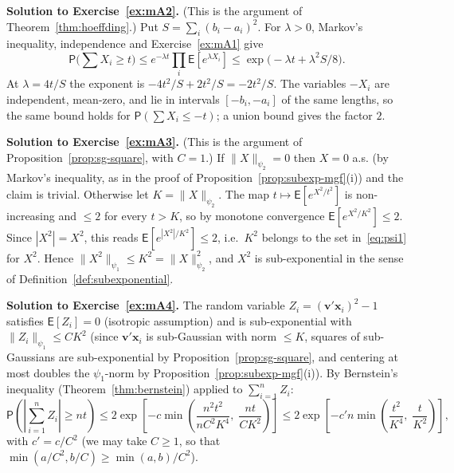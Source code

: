\documentclass[12pt,a4paper]{article}
\theoremstyle{definition}
\newcommand\expc{\mathsf{E}}
\newcommand\prb{\mathsf{P}}
\newcommand{\bx}{\mathbf{x}}
\newcommand{\bv}{\mathbf{v}}
\begin{document}
\textbf{Solution to Exercise~\ref{ex:mA2}.} (This is the argument of Theorem~\ref{thm:hoeffding}.) Put $S = \sum_i(b_i - a_i)^2$. For $\lambda > 0$, Markov's inequality, independence and Exercise~\ref{ex:mA1} give
\[
\prb\Big(\sum X_i \geqslant t\Big) \leqslant e^{-\lambda t}\prod_i\expc[e^{\lambda X_i}] \leqslant \exp\!\big(-\lambda t + \lambda^2 S/8\big).
\]
At $\lambda = 4t/S$ the exponent is $-4t^2/S + 2t^2/S = -2t^2/S$. The variables $-X_i$ are independent, mean-zero, and lie in intervals $[-b_i, -a_i]$ of the same lengths, so the same bound holds for $\prb(\sum X_i \leqslant -t)$; a union bound gives the factor $2$.

\textbf{Solution to Exercise~\ref{ex:mA3}.} (This is the argument of Proposition~\ref{prop:sg-square}, with $C = 1$.) If $\|X\|_{\psi_2} = 0$ then $X = 0$ a.s. (by Markov's inequality, as in the proof of Proposition~\ref{prop:subexp-mgf}(i)) and the claim is trivial. Otherwise let $K = \|X\|_{\psi_2}$. The map $t \mapsto \expc[e^{X^2/t^2}]$ is non-increasing and $\leqslant 2$ for every $t > K$, so by monotone convergence $\expc[e^{X^2/K^2}] \leqslant 2$. Since $|X^2| = X^2$, this reads $\expc[e^{|X^2|/K^2}] \leqslant 2$, i.e.\ $K^2$ belongs to the set in~\eqref{eq:psi1} for $X^2$. Hence $\|X^2\|_{\psi_1} \leqslant K^2 = \|X\|_{\psi_2}^2$, and $X^2$ is sub-exponential in the sense of Definition~\ref{def:subexponential}.

\textbf{Solution to Exercise~\ref{ex:mA4}.} The random variable $Z_i = (\bv'\bx_i)^2 - 1$ satisfies $\expc[Z_i] = 0$ (isotropic assumption) and is sub-exponential with $\|Z_i\|_{\psi_1} \leqslant CK^2$ (since $\bv'\bx_i$ is sub-Gaussian with norm $\leqslant K$, squares of sub-Gaussians are sub-exponential by Proposition~\ref{prop:sg-square}, and centering at most doubles the $\psi_1$-norm by Proposition~\ref{prop:subexp-mgf}(i)). By Bernstein's inequality (Theorem~\ref{thm:bernstein}) applied to $\sum_{i=1}^n Z_i$:
\[
\prb\!\left(\left|\sum_{i=1}^n Z_i\right| \geqslant nt\right) \leqslant 2\exp\!\left[-c\min\!\left(\frac{n^2t^2}{nC^2K^4},\; \frac{nt}{CK^2}\right)\right] \leqslant 2\exp\!\left[-c'n\min\!\left(\frac{t^2}{K^4},\; \frac{t}{K^2}\right)\right],
\]
with $c' = c/C^2$ (we may take $C \geqslant 1$, so that $\min(a/C^2, b/C) \geqslant \min(a,b)/C^2$).
\end{document}
